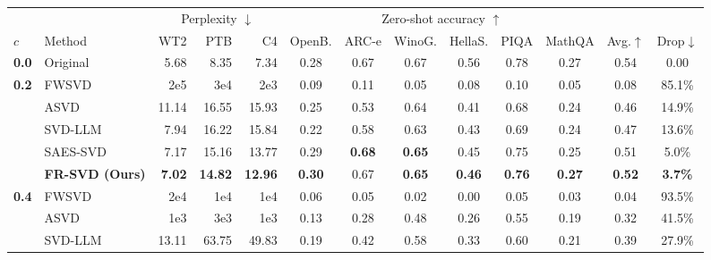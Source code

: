 \begin{table}[t]
\centering
\small
\setlength{\tabcolsep}{2pt}
\renewcommand{\arraystretch}{1.10}
\begin{tabular*}{\textwidth}{@{\extracolsep{\fill}}llrrrcccccccc@{}}
\toprule
\multicolumn{2}{c}{} & \multicolumn{3}{c}{Perplexity $\downarrow$}
 & \multicolumn{6}{c}{Zero-shot accuracy $\uparrow$} & & \\
\cmidrule(lr){3-5}\cmidrule(lr){6-11}
$c$ & Method & WT2 & PTB & C4 & OpenB. & ARC-e & WinoG. & HellaS.
 & PIQA & MathQA & Avg.$\uparrow$ & Drop$\downarrow$ \\
\midrule
\multirow{1}{*}{\color[HTML]{9B9B9B}\textbf{0.0}}
 & {\color[HTML]{9B9B9B}Original} & {\color[HTML]{9B9B9B}5.68} & {\color[HTML]{9B9B9B}8.35} & {\color[HTML]{9B9B9B}7.34} & {\color[HTML]{9B9B9B}0.28} & {\color[HTML]{9B9B9B}0.67} & {\color[HTML]{9B9B9B}0.67} & {\color[HTML]{9B9B9B}0.56} & {\color[HTML]{9B9B9B}0.78} & {\color[HTML]{9B9B9B}0.27} & {\color[HTML]{9B9B9B}0.54} & {\color[HTML]{9B9B9B}0.00} \\
\midrule
\multirow{5}{*}{\textbf{0.2}}
 & FWSVD                          & 2e5   & 3e4   & 2e3   & 0.09 & 0.11 & 0.05 & 0.08 & 0.10 & 0.05 & 0.08 & 85.1\% \\
 & ASVD                            & 11.14 & 16.55 & 15.93 & 0.25 & 0.53 & 0.64 & 0.41 & 0.68 & 0.24 & 0.46 & 14.9\% \\
 & SVD-LLM                         & 7.94  & 16.22 & 15.84 & 0.22 & 0.58 & 0.63 & 0.43 & 0.69 & 0.24 & 0.47 & 13.6\% \\
 & SAES-SVD                        & 7.17  & 15.16 & 13.77 & 0.29 & \textbf{0.68} & \textbf{0.65} & 0.45 & 0.75 & 0.25 & 0.51 & 5.0\% \\
\rowcolor{gray!12}
 & \textbf{FR-SVD (Ours)}         & \textbf{7.02} & \textbf{14.82} & \textbf{12.96} & \textbf{0.30} & 0.67 & \textbf{0.65} & \textbf{0.46} & \textbf{0.76} & \textbf{0.27} & \textbf{0.52} & \textbf{3.7\%} \\
\midrule
\multirow{5}{*}{\textbf{0.4}}
 & FWSVD                          & 2e4   & 1e4   & 1e4   & 0.06 & 0.05 & 0.02 & 0.00 & 0.05 & 0.03 & 0.04 & 93.5\% \\
 & ASVD                            & 1e3   & 3e3   & 1e3   & 0.13 & 0.28 & 0.48 & 0.26 & 0.55 & 0.19 & 0.32 & 41.5\% \\
 & SVD-LLM                         & 13.11 & 63.75 & 49.83 & 0.19 & 0.42 & 0.58 & 0.33 & 0.60 & 0.21 & 0.39 & 27.9\% \\

\end{tabular*}
\end{table}
